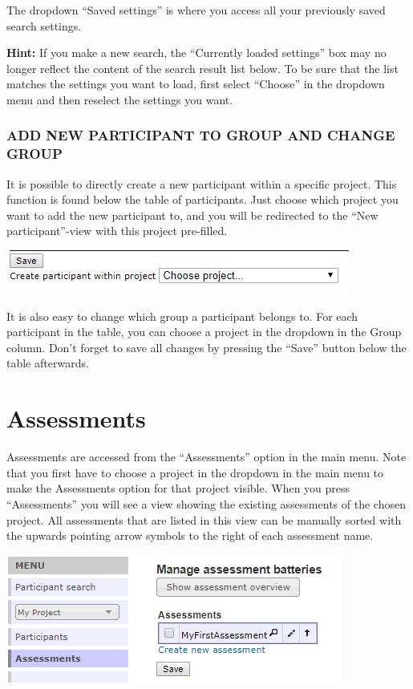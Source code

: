 \documentclass[]{book}
\begin{document}
The dropdown ``Saved settings'' is where you access all your previously saved search settings.

\textbf{Hint:} If you make a new search, the ``Currently loaded settings'' box may no longer reflect the content of the search result list below. To be sure that the list matches the settings you want to load, first select ``Choose'' in the dropdown menu and then reselect the settings you want.

\hypertarget{add-new-participant-to-group-and-change-group}{%
\subsection{ADD NEW PARTICIPANT TO GROUP AND CHANGE GROUP}\label{add-new-participant-to-group-and-change-group}}

It is possible to directly create a new participant within a specific project. This function is found below the table of participants. Just choose which project you want to add the new participant to, and you will be redirected to the ``New participant''-view with this project pre-filled.

\includegraphics{images/add-new-participants.png}

It is also easy to change which group a participant belongs to. For each participant in the table, you can choose a project in the dropdown in the Group column. Don't forget to save all changes by pressing the ``Save'' button below the table afterwards.

\hypertarget{assessments}{%
\chapter{Assessments}\label{assessments}}

Assessments are accessed from the ``Assessments'' option in the main menu. Note that you first have to choose a project in the dropdown in the main menu to make the Assessments option for that project visible. When you press ``Assessments'' you will see a view showing the existing assessments of the chosen project. All assessments that are listed in this view can be manually sorted with the upwards pointing arrow symbols to the right of each assessment name.

\includegraphics{images/assessement.png}
\end{document}

